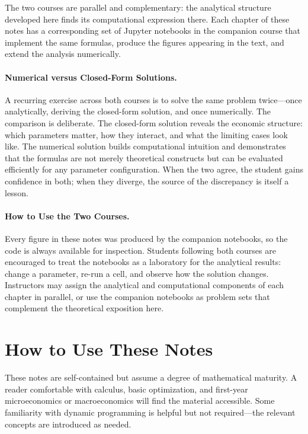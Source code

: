 The two courses are parallel and complementary: the analytical structure developed here finds its computational expression there.
Each chapter of these notes has a corresponding set of Jupyter notebooks in the companion course that implement the same formulas, produce the figures appearing in the text, and extend the analysis numerically.

\paragraph{Numerical versus Closed-Form Solutions.}
A recurring exercise across both courses is to solve the same problem twice---once analytically, deriving the closed-form solution, and once numerically.
The comparison is deliberate.
The closed-form solution reveals the economic structure: which parameters matter, how they interact, and what the limiting cases look like.
The numerical solution builds computational intuition and demonstrates that the formulas are not merely theoretical constructs but can be evaluated efficiently for any parameter configuration.
When the two agree, the student gains confidence in both; when they diverge, the source of the discrepancy is itself a lesson.

\paragraph{How to Use the Two Courses.}
Every figure in these notes was produced by the companion notebooks, so the code is always available for inspection.
Students following both courses are encouraged to treat the notebooks as a laboratory for the analytical results: change a parameter, re-run a cell, and observe how the solution changes.
Instructors may assign the analytical and computational components of each chapter in parallel, or use the companion notebooks as problem sets that complement the theoretical exposition here.

\section{How to Use These Notes}
\label{sec:how-to-use}

These notes are self-contained but assume a degree of mathematical maturity.
A reader comfortable with calculus, basic optimization, and first-year microeconomics or macroeconomics will find the material accessible.
Some familiarity with dynamic programming is helpful but not required---the relevant concepts are introduced as needed.

